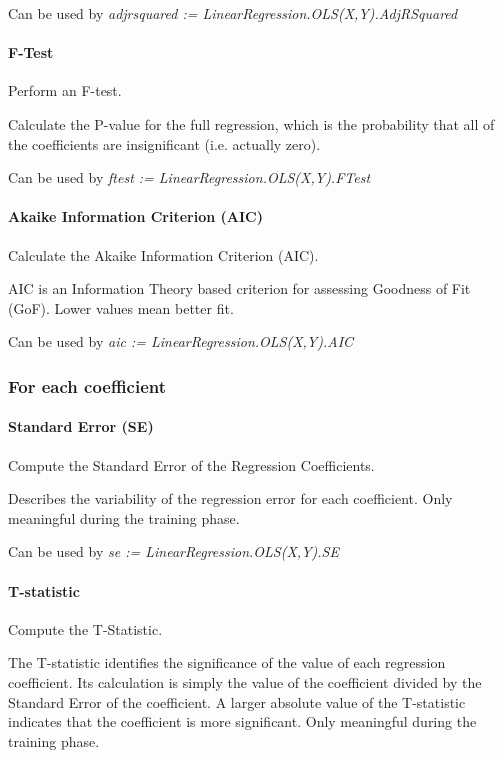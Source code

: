 Can be used by \textit{adjrsquared := LinearRegression.OLS(X,Y).AdjRSquared}

\paragraph{F-Test}

Perform an F-test.

Calculate the P-value for the full regression, which is the probability that all of the coefficients are insignificant (i.e. actually zero).

Can be used by \textit{ftest := LinearRegression.OLS(X,Y).FTest}

\paragraph{Akaike Information Criterion (AIC)}

Calculate the Akaike Information Criterion (AIC).

AIC is an Information Theory based criterion for assessing Goodness of Fit (GoF). Lower values mean better fit.

Can be used by \textit{aic := LinearRegression.OLS(X,Y).AIC}

\subsubsection{For each coefficient}

\paragraph{Standard Error (SE)}

Compute the Standard Error of the Regression Coefficients. 

Describes the variability of the regression error for each coefficient. Only meaningful during the training phase.

Can be used by \textit{se := LinearRegression.OLS(X,Y).SE}

\paragraph{T-statistic}

Compute the T-Statistic.

The T-statistic identifies the significance of the value of each regression coefficient. Its calculation is simply the value of the coefficient divided by the Standard Error of the coefficient. A larger absolute value of the T-statistic indicates that the coefficient is more significant. Only meaningful during the training phase.

